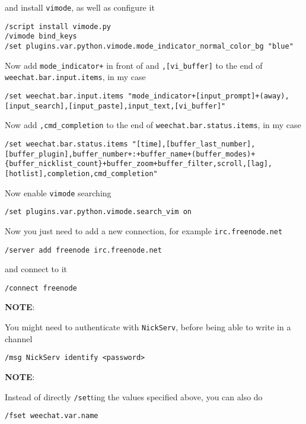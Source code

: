 \documentclass[9pt]{report}
\newcommand{\admonition}[2]{\textbf{#1}: {#2}}
\begin{document}
and install \texttt{vimode}, as well as configure it


\begin{verbatim}
/script install vimode.py
/vimode bind_keys
/set plugins.var.python.vimode.mode_indicator_normal_color_bg "blue"
\end{verbatim}

Now add \texttt{mode\_indicator+} in front of and \texttt{,[vi\_buffer]} to the end of \texttt{weechat.bar.input.items}, in my case


\begin{verbatim}
/set weechat.bar.input.items "mode_indicator+[input_prompt]+(away),[input_search],[input_paste],input_text,[vi_buffer]"
\end{verbatim}

Now add \texttt{,cmd\_completion} to the end of \texttt{weechat.bar.status.items}, in my case


\begin{verbatim}
/set weechat.bar.status.items "[time],[buffer_last_number],[buffer_plugin],buffer_number+:+buffer_name+(buffer_modes)+{buffer_nicklist_count}+buffer_zoom+buffer_filter,scroll,[lag],[hotlist],completion,cmd_completion"
\end{verbatim}

Now enable \texttt{vimode} searching


\begin{verbatim}
/set plugins.var.python.vimode.search_vim on
\end{verbatim}

Now you just need to add a new connection, for example \texttt{irc.freenode.net}


\begin{verbatim}
/server add freenode irc.freenode.net
\end{verbatim}

and connect to it


\begin{verbatim}
/connect freenode
\end{verbatim}

\admonition{NOTE}{You might need to authenticate with \texttt{NickServ}, before being able to write in a channel


}
\begin{verbatim}
/msg NickServ identify <password>
\end{verbatim}
\admonition{NOTE}{Instead of directly \texttt{/set}ting the values specified above, you can also do


}
\begin{verbatim}
/fset weechat.var.name
\end{verbatim}
\end{document}
